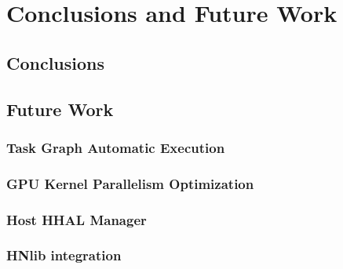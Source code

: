 \chapter{Conclusions and Future Work} \label{ch:Conclusions}

\section{Conclusions}

\section{Future Work}
\subsection{Task Graph Automatic Execution}
\subsection{GPU Kernel Parallelism Optimization}
\subsection{Host HHAL Manager}
\subsection{HNlib integration}



